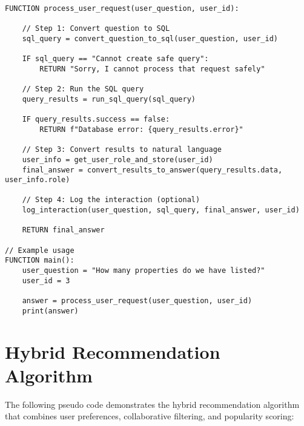 \begin{verbatim}
FUNCTION process_user_request(user_question, user_id):
    
    // Step 1: Convert question to SQL
    sql_query = convert_question_to_sql(user_question, user_id)
    
    IF sql_query == "Cannot create safe query":
        RETURN "Sorry, I cannot process that request safely"
    
    // Step 2: Run the SQL query
    query_results = run_sql_query(sql_query)
    
    IF query_results.success == false:
        RETURN f"Database error: {query_results.error}"
    
    // Step 3: Convert results to natural language
    user_info = get_user_role_and_store(user_id)
    final_answer = convert_results_to_answer(query_results.data, user_info.role)
    
    // Step 4: Log the interaction (optional)
    log_interaction(user_question, sql_query, final_answer, user_id)
    
    RETURN final_answer

// Example usage
FUNCTION main():
    user_question = "How many properties do we have listed?"
    user_id = 3
    
    answer = process_user_request(user_question, user_id)
    print(answer)
\end{verbatim}

\section{Hybrid Recommendation Algorithm}
\label{app:D}

The following pseudo code demonstrates the hybrid recommendation algorithm that combines user preferences, collaborative filtering, and popularity scoring:

